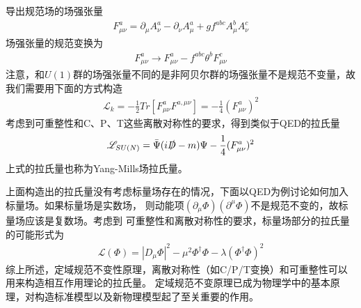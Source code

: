 导出规范场的场强张量
\begin{eqnarray}
F^a_{\mu\nu} = \partial_{\mu}A^a_{\nu} - \partial_{\nu}A^a_{\mu} + gf^{abc}A^b_{\mu}A^c_{\nu}
\end{eqnarray}
场强张量的规范变换为
\begin{eqnarray}
F^a_{\mu\nu} \to F^a_{\mu\nu} - f^{abc} \theta^b F^c_{\mu\nu}
\end{eqnarray}
注意，和$U(1)$群的场强张量不同的是非阿贝尔群的场强张量不是规范不变量，故我们需要用下面的方式构造
\begin{eqnarray}
\mathscr{L}_k = -\frac{1}{2} Tr\left[ F^a_{\mu\nu} F^{a,\mu\nu} \right] = -\frac{1}{4} (F^a_{\mu\nu})^2
\end{eqnarray}
考虑到可重整性和C、P、T这些离散对称性的要求，得到类似于QED的拉氏量
\begin{eqnarray}
\mathscr{L}_{SU(N)} = \bar{\Psi} (i\slashed{D} - m) \Psi - \frac{1}{4}(F^a_{\mu\nu})^2
\end{eqnarray}
上式的拉氏量也称为Yang-Mills场拉氏量\cite{Yang-Mills}。

上面构造出的拉氏量没有考虑标量场存在的情况，下面以QED为例讨论如何加入标量场。如果标量场是实数场，
则动能项$(\partial_{\mu}\Phi)(\partial^{\mu}\Phi)$不是规范不变的，故标量场应该是复数场。考虑到
可重整性和离散对称性的要求，标量场部分的拉氏量的可能形式为
\begin{eqnarray}
\mathscr{L}(\Phi) = |D_{\mu}\Phi|^2 - \mu^2 \Phi^{\dagger}\Phi - \lambda(\Phi^{\dagger}\Phi)^2
\end{eqnarray}
综上所述，定域规范不变性原理，离散对称性（如C/P/T变换）和可重整性可以用来构造相互作用理论的拉氏量。
定域规范不变原理已成为物理学中的基本原理，对构造标准模型以及新物理模型起了至关重要的作用。

